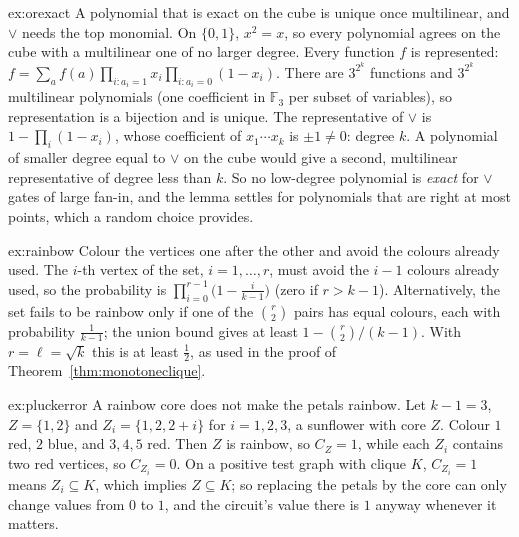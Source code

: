 \begin{solution}{ex:orexact}
\idea A polynomial that is exact on the cube is unique once multilinear, and $\lor$ needs the top monomial.
\writeup On $\{0,1\}$, $x^2=x$, so every polynomial agrees on the cube with a multilinear one of no larger degree. Every function $f$ is represented: $f=\sum_af(a)\prod_{i:a_i=1}x_i\prod_{i:a_i=0}(1-x_i)$. There are $3^{2^k}$ functions and $3^{2^k}$ multilinear polynomials (one coefficient in $\mathbb F_3$ per subset of variables), so representation is a bijection and is unique. The representative of $\lor$ is $1-\prod_i(1-x_i)$, whose coefficient of $x_1\cdots x_k$ is $\pm1\ne0$: degree $k$. A polynomial of smaller degree equal to $\lor$ on the cube would give a second, multilinear representative of degree less than $k$. So no low-degree polynomial is \emph{exact} for $\lor$ gates of large fan-in, and the lemma settles for polynomials that are right at most points, which a random choice provides.
\end{solution}

\begin{solution}{ex:rainbow}
\idea Colour the vertices one after the other and avoid the colours already used.
\writeup The $i$-th vertex of the set, $i=1,\dots,r$, must avoid the $i-1$ colours already used, so the probability is $\prod_{i=0}^{r-1}\bigl(1-\frac i{k-1}\bigr)$ (zero if $r>k-1$). Alternatively, the set fails to be rainbow only if one of the $\binom r2$ pairs has equal colours, each with probability $\frac1{k-1}$; the union bound gives at least $1-\binom r2/(k-1)$. With $r=\ell=\sqrt k$ this is at least $\frac12$, as used in the proof of Theorem~\ref{thm:monotoneclique}.
\end{solution}

\begin{solution}{ex:pluckerror}
\idea A rainbow core does not make the petals rainbow.
\writeup Let $k-1=3$, $Z=\{1,2\}$ and $Z_i=\{1,2,2+i\}$ for $i=1,2,3$, a sunflower with core $Z$. Colour $1$ red, $2$ blue, and $3,4,5$ red. Then $Z$ is rainbow, so $C_Z=1$, while each $Z_i$ contains two red vertices, so $C_{Z_i}=0$. On a positive test graph with clique $K$, $C_{Z_i}=1$ means $Z_i\subseteq K$, which implies $Z\subseteq K$; so replacing the petals by the core can only change values from $0$ to $1$, and the circuit's value there is $1$ anyway whenever it matters.
\end{solution}

